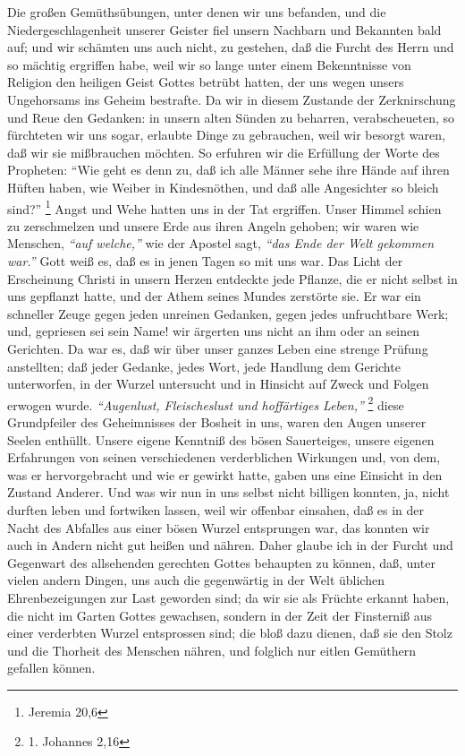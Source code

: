 Die großen Gemüthsübungen, unter denen wir uns befanden,
und die
Niedergeschlagenheit unserer Geister fiel unsern Nachbarn und Bekannten bald
auf; und wir schämten uns auch nicht, zu gestehen, daß die Furcht des Herrn und
so mächtig ergriffen habe, weil wir so lange unter einem Bekenntnisse von
Religion den heiligen Geist Gottes betrübt hatten, der uns wegen unsers
Ungehorsams ins Geheim bestrafte. Da wir in diesem
Zustande der Zerknirschung
und Reue den Gedanken: in unsern alten Sünden zu beharren, verabscheueten, so
fürchteten wir uns sogar, erlaubte Dinge zu gebrauchen, weil wir besorgt waren,
daß wir sie mißbrauchen möchten. So erfuhren wir die Erfüllung der Worte des
Propheten:
"`Wie geht es denn zu, daß ich alle Männer sehe ihre Hände auf ihren
Hüften haben, wie Weiber in Kindesnöthen, und daß alle Angesichter so bleich
sind?"'
\footnote{Jeremia 20,6}
Angst und Wehe hatten uns in der Tat ergriffen.
Unser Himmel schien zu zerschmelzen und unsere Erde aus ihren Angeln gehoben;
wir waren wie Menschen, \textit{"`auf welche,"'} wie der Apostel sagt,
\textit{"`das Ende der Welt gekommen war."'} Gott weiß es,
daß es in jenen Tagen so mit uns war. Das
Licht der Erscheinung Christi in unsern Herzen entdeckte jede Pflanze, die er
nicht selbst in uns gepflanzt hatte, und der Athem seines Mundes zerstörte sie.
Er war ein schneller Zeuge gegen jeden unreinen Gedanken, gegen jedes
unfruchtbare Werk; und, gepriesen sei sein Name! wir ärgerten uns nicht an ihm
oder an seinen Gerichten. Da war es, daß wir über unser
ganzes Leben eine
strenge Prüfung anstellten; daß jeder
Gedanke, jedes Wort, jede Handlung dem
Gerichte unterworfen, in der Wurzel untersucht und in Hinsicht auf Zweck und
Folgen erwogen wurde.
\textit{"`Augenlust, Fleischeslust und hoffärtiges Leben,"'}
\footnote{1. Johannes 2,16}
diese Grundpfeiler des Geheimnisses der Bosheit
in uns, waren den Augen unserer Seelen enthüllt. Unsere eigene Kenntniß des
bösen Sauerteiges, unsere eigenen Erfahrungen von seinen
verschiedenen
verderblichen Wirkungen und, von dem, was er hervorgebracht und wie er gewirkt
hatte, gaben uns eine Einsicht in den Zustand Anderer. Und was wir nun in uns
selbst nicht billigen konnten, ja, nicht durften leben und fortwiken lassen,
weil
wir offenbar einsahen, daß es in der Nacht des Abfalles aus einer bösen Wurzel
entsprungen war, das konnten wir auch in Andern nicht gut heißen und nähren.
Daher glaube ich in der Furcht und Gegenwart des allsehenden gerechten Gottes
behaupten zu können, daß, unter vielen andern Dingen, uns auch die gegenwärtig
in der Welt üblichen Ehrenbezeigungen zur Last geworden sind; da wir sie als
Früchte erkannt haben, die nicht im Garten Gottes
gewachsen, sondern in der Zeit
der Finsterniß aus einer verderbten Wurzel entsprossen sind; die bloß dazu
dienen, daß sie den Stolz und die Thorheit des Menschen nähren, und folglich nur
eitlen Gemüthern gefallen können.

